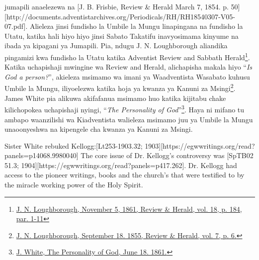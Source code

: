 jumapili anaelezewa na [J. B. Frisbie, Review \& Herald March 7, 1854. p. 50][http://documents.adventistarchives.org/Periodicals/RH/RH18540307-V05-07.pdf]. Alieleza jinsi fundisho la Umbile la Mungu linapingana na fundisho la Utatu, katika hali hiyo hiyo jinsi Sabato Takatifu inavyosimama kinyume na ibada ya kipagani ya Jumapili. Pia, ndugu J. N. Loughborough aliandika pingamizi kwa fundisho la Utatu katika Adventist Review and Sabbath Herald\footnote{\href{https://adventistdigitallibrary.org/adl-349160/advent-review-and-sabbath-herald-november-5-1861}{J. N. Loughborough, November 5, 1861, Review \& Herald, vol. 18, p. 184, par. 1-11}}. Katika uchapishaji mwingine wa Review and Herald, alichapisha makala hiyo “\textit{Is God a person?}”, akieleza msimamo wa imani ya Waadventista Wasabato kuhusu Umbile la Mungu, iliyoelezwa katika hoja ya kwanza ya Kanuni za Msingi\footnote{\href{http://documents.adventistarchives.org/Periodicals/RH/RH18550918-V07-06.pdf}{J. N. Loughborough, September 18. 1855, Review \& Herald, vol. 7, p. 6.}}. James White pia alikuwa akifafanua msimamo huo katika kijitabu chake kilichopokea uchapishaji nyingi, “\textit{The Personality of God}”\footnote{\href{https://egwwritings.org/?ref=en_PERGO.1.1&para=1471.3}{J. White, The Personality of God, June 18. 1861.}}. Haya ni mifano tu ambapo waanzilishi wa Kiadventista walieleza msimamo juu ya Umbile la Mungu unaoonyeshwa na kipengele cha kwanza ya Kanuni za Msingi.


Sister White rebuked Kellogg:[Lt253-1903.32; 1903][https://egwwritings.org/read?panels=p14068.9980040] The core issue of Dr. Kellogg’s controversy was [SpTB02 51.3; 1904][https://egwwritings.org/read?panels=p417.262]. Dr. Kellogg had access to the pioneer writings, books and the church's  that were testified to by the miracle working power of the Holy Spirit.


